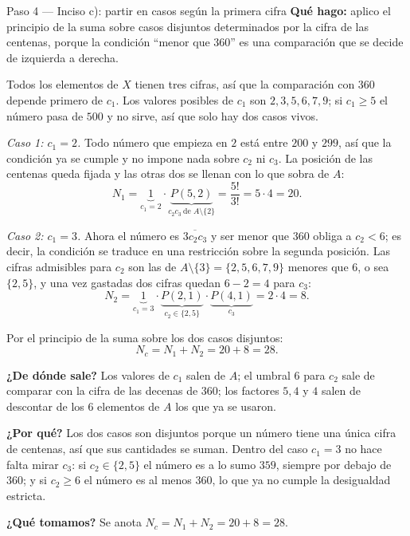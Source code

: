 \documentclass[11pt]{article}
\begin{document}
\begin{paso}{Paso 4 --- Inciso c): partir en casos según la primera cifra}
\textbf{Qué hago:} aplico el principio de la suma sobre casos disjuntos determinados por la cifra de las centenas, porque la condición ``menor que $360$'' es una comparación que se decide de izquierda a derecha.

Todos los elementos de $X$ tienen tres cifras, así que la comparación con $360$ depende primero de $c_1$. Los valores posibles de $c_1$ son $2,3,5,6,7,9$; si $c_1\ge 5$ el número pasa de $500$ y no sirve, así que solo hay dos casos vivos.

\emph{Caso 1: $c_1=2$.} Todo número que empieza en $2$ está entre $200$ y $299$, así que la condición ya se cumple y no impone nada sobre $c_2$ ni $c_3$. La posición de las centenas queda fijada y las otras dos se llenan con lo que sobra de $A$:
\[
  N_1 = \underbrace{1}_{c_1=2}\cdot \underbrace{P(5,2)}_{c_2c_3\ \text{de }A\setminus\{2\}} = \frac{5!}{3!} = 5\cdot 4 = 20 .
\]

\emph{Caso 2: $c_1=3$.} Ahora el número es $\overline{3c_2c_3}$ y ser menor que $360$ obliga a $c_2<6$; es decir, la condición se traduce en una restricción sobre la segunda posición. Las cifras admisibles para $c_2$ son las de $A\setminus\{3\}=\{2,5,6,7,9\}$ menores que $6$, o sea $\{2,5\}$, y una vez gastadas dos cifras quedan $6-2=4$ para $c_3$:
\[
  N_2 = \underbrace{1}_{c_1=3}\cdot \underbrace{P(2,1)}_{c_2\in\{2,5\}}\cdot \underbrace{P(4,1)}_{c_3} = 2\cdot 4 = 8 .
\]

Por el principio de la suma sobre los dos casos disjuntos:
\[
  N_c = N_1+N_2 = 20+8 = 28 .
\]

\textbf{¿De dónde sale?} Los valores de $c_1$ salen de $A$; el umbral $6$ para $c_2$ sale de comparar con la cifra de las decenas de $360$; los factores $5,4$ y $4$ salen de descontar de los $6$ elementos de $A$ los que ya se usaron.

\textbf{¿Por qué?} Los dos casos son disjuntos porque un número tiene una única cifra de centenas, así que sus cantidades se suman. Dentro del caso $c_1=3$ no hace falta mirar $c_3$: si $c_2\in\{2,5\}$ el número es a lo sumo $359$, siempre por debajo de $360$; y si $c_2\ge 6$ el número es al menos $360$, lo que ya no cumple la desigualdad estricta.

\textbf{¿Qué tomamos?} Se anota $N_c=N_1+N_2=20+8=28$.
\end{paso}
\end{document}
